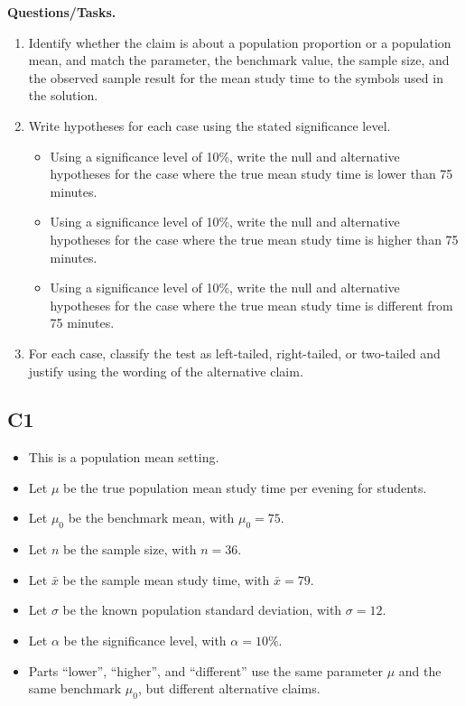 		\textbf{Questions/Tasks.}
		\begin{enumerate}
			\item[(C1)] Identify whether the claim is about a population proportion or a population mean, and match the parameter, the benchmark value, the sample size, and the observed sample result for the mean study time to the symbols used in the solution.
			\item[(C2)] Write hypotheses for each case using the stated significance level.
			\begin{itemize}
				\item[(a)] Using a significance level of 10\%, write the null and alternative hypotheses for the case where the true mean study time is lower than 75 minutes.
				\item[(b)] Using a significance level of 10\%, write the null and alternative hypotheses for the case where the true mean study time is higher than 75 minutes.
				\item[(c)] Using a significance level of 10\%, write the null and alternative hypotheses for the case where the true mean study time is different from 75 minutes.
			\end{itemize}
			\item[(C3)] For each case, classify the test as left-tailed, right-tailed, or two-tailed and justify using the wording of the alternative claim.
		\end{enumerate}
		
		\subsection*{C1}
		\begin{itemize}
			\item This is a population mean setting.
			\item Let \(\mu\) be the true population mean study time per evening for students.
			\item Let \(\mu_0\) be the benchmark mean, with \(\mu_0=75\).
			\item Let \(n\) be the sample size, with \(n=36\).
			\item Let \(\bar{x}\) be the sample mean study time, with \(\bar{x}=79\).
			\item Let \(\sigma\) be the known population standard deviation, with \(\sigma=12\).
			\item Let \(\alpha\) be the significance level, with \(\alpha=10\%\).
			\item Parts ``lower'', ``higher'', and ``different'' use the same parameter \(\mu\) and the same benchmark \(\mu_0\), but different alternative claims.
		\end{itemize}
		
